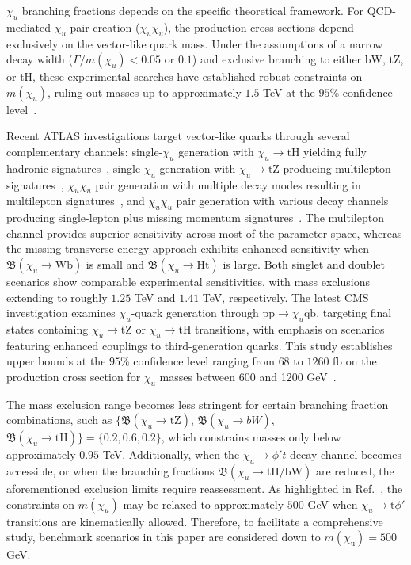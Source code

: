 $\chi_u$ branching fractions depends on the specific theoretical framework. For QCD-mediated $\chi_u$ pair creation ($\chi_u\bar{\chi}_u$), the production cross sections depend exclusively on the vector-like quark mass. Under the assumptions of a narrow decay width ($\Gamma / m(\chi_u) < 0.05$ or $0.1$) and exclusive branching to either $\textrm{bW}$, $\textrm{tZ}$, or $\textrm{tH}$, these experimental searches have established robust constraints on $m(\chi_u)$, ruling out masses up to approximately $1.5$ \textrm{TeV} at the $95$\% confidence level~\parencite{CMS:2024bni,CMS:2024qdd,ATLAS:2022ozf,ATLAS:2023bfh,ATLAS:2022hnn,ATLAS:2022tla,ATLAS:2023pja,ATLAS:2024fdw}. 

Recent ATLAS investigations target vector-like quarks through several complementary channels: single-$\chi_u$ generation with $\chi_u \to \textrm{tH}$ yielding fully hadronic signatures~\parencite{ATLAS:2022ozf}, single-$\chi_u$ generation with $\chi_u \to \textrm{tZ}$ producing multilepton signatures~\parencite{ATLAS:2023bfh}, $\chi_u\chi_u$ pair generation with multiple decay modes resulting in multilepton signatures~\parencite{ATLAS:2022hnn}, and $\chi_u\chi_u$ pair generation with various decay channels producing single-lepton plus missing momentum signatures~\parencite{ATLAS:2022tla,ATLAS:2023pja}. The multilepton channel provides superior sensitivity across most of the parameter space, whereas the missing transverse energy approach exhibits enhanced sensitivity when $\mathfrak{B}(\chi_u\to \textrm{Wb})$ is small and $\mathfrak{B}(\chi_u\to \textrm{Ht})$ is large. Both singlet and doublet scenarios show comparable experimental sensitivities, with mass exclusions extending to roughly $1.25$ \textrm{TeV} and $1.41$ \textrm{TeV}, respectively. The latest CMS investigation examines $\chi_u$-quark generation through $\mathrm{pp} \to \chi_u\textrm{qb}$, targeting final states containing $\chi_u \to \textrm{tZ}$ or $\chi_u \to \textrm{tH}$ transitions, with emphasis on scenarios featuring enhanced couplings to third-generation quarks. This study establishes upper bounds at the $95$\% confidence level ranging from $68$ to $1260$ \textrm{fb} on the production cross section for $\chi_u$ masses between 600 and 1200 \textrm{GeV}~\parencite{CMS:2024qdd}.

The mass exclusion range becomes less stringent for certain branching fraction combinations, such as $\{\mathfrak{B}(\chi_u \to \textrm{tZ})$, $\mathfrak{B}(\chi_u \to bW)$, $\mathfrak{B}(\chi_u \to \textrm{tH})\}= \{0.2, 0.6, 0.2\}$, which constrains masses only below approximately $0.95$ \textrm{TeV}. Additionally, when the $\chi_u \to \phi't $ decay channel becomes accessible, or when the branching fractions $\mathfrak{B}(\chi_u \to \textrm{tH/bW})$ are reduced, the aforementioned exclusion limits require reassessment. As highlighted in Ref.~\parencite{Cacciapaglia:2019zmj}, the constraints on $m(\chi_u)$ may be relaxed to approximately $500$ \textrm{GeV} when $\chi_u \to \mathrm{t}\phi'$ transitions are kinematically allowed. Therefore, to facilitate a comprehensive study, benchmark scenarios in this paper are considered down to $m(\chi_\mathrm{u}) = 500$ \textrm{GeV}.
